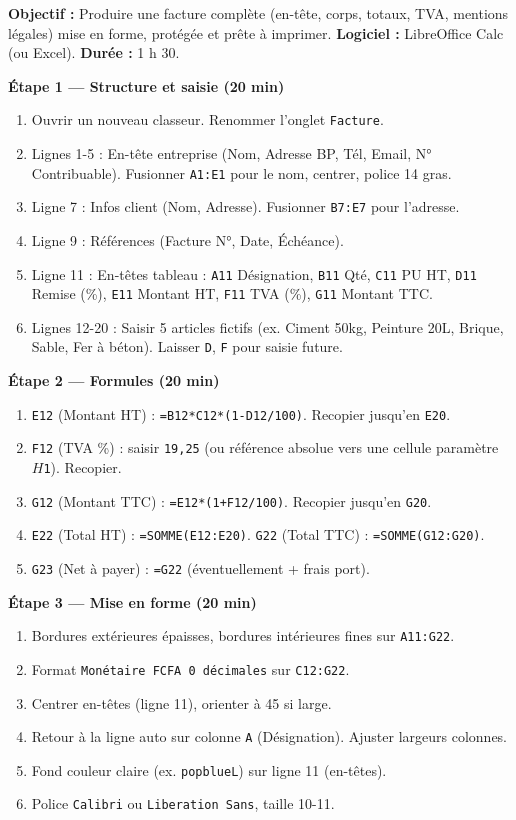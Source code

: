 \documentclass[11pt]{article}
\begin{document}
\begin{experience}
\textbf{Objectif :} Produire une facture complète (en-tête, corps, totaux, TVA, mentions légales) mise en forme, protégée et prête à imprimer.
\textbf{Logiciel :} LibreOffice Calc (ou Excel).
\textbf{Durée :} 1 h 30.

\textbf{Étape 1 — Structure et saisie (20 min)}
\begin{enumerate}
\item Ouvrir un nouveau classeur. Renommer l'onglet \texttt{Facture}.
\item Lignes 1-5 : En-tête entreprise (Nom, Adresse BP, Tél, Email, N° Contribuable). Fusionner \texttt{A1:E1} pour le nom, centrer, police 14 gras.
\item Ligne 7 : Infos client (Nom, Adresse). Fusionner \texttt{B7:E7} pour l'adresse.
\item Ligne 9 : Références (Facture N°, Date, Échéance).
\item Ligne 11 : En-têtes tableau : \texttt{A11} Désignation, \texttt{B11} Qté, \texttt{C11} PU HT, \texttt{D11} Remise (\%), \texttt{E11} Montant HT, \texttt{F11} TVA (\%), \texttt{G11} Montant TTC.
\item Lignes 12-20 : Saisir 5 articles fictifs (ex. Ciment 50kg, Peinture 20L, Brique, Sable, Fer à béton). Laisser \texttt{D}, \texttt{F} pour saisie future.
\end{enumerate}

\textbf{Étape 2 — Formules (20 min)}
\begin{enumerate}
\item \texttt{E12} (Montant HT) : \texttt{=B12*C12*(1-D12/100)}. Recopier jusqu'en \texttt{E20}.
\item \texttt{F12} (TVA \%) : saisir \texttt{19,25} (ou référence absolue vers une cellule paramètre \texttt{$H$1}). Recopier.
\item \texttt{G12} (Montant TTC) : \texttt{=E12*(1+F12/100)}. Recopier jusqu'en \texttt{G20}.
\item \texttt{E22} (Total HT) : \texttt{=SOMME(E12:E20)}. \texttt{G22} (Total TTC) : \texttt{=SOMME(G12:G20)}.
\item \texttt{G23} (Net à payer) : \texttt{=G22} (éventuellement + frais port).
\end{enumerate}

\textbf{Étape 3 — Mise en forme (20 min)}
\begin{enumerate}
\item Bordures extérieures épaisses, bordures intérieures fines sur \texttt{A11:G22}.
\item Format \texttt{Monétaire FCFA 0 décimales} sur \texttt{C12:G22}.
\item Centrer en-têtes (ligne 11), orienter à 45\textdegree{} si large.
\item Retour à la ligne auto sur colonne \texttt{A} (Désignation). Ajuster largeurs colonnes.
\item Fond couleur claire (ex. \texttt{popblueL}) sur ligne 11 (en-têtes).
\item Police \texttt{Calibri} ou \texttt{Liberation Sans}, taille 10-11.
\end{enumerate}


\end{experience}
\end{document}
